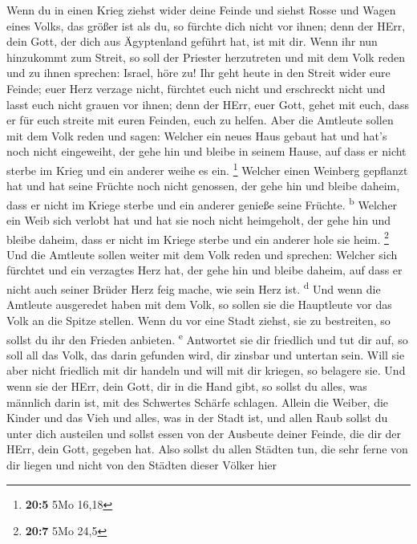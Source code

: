 Wenn du in einen Krieg ziehst wider deine Feinde und
siehst Rosse und Wagen eines Volks, das größer ist als du, so fürchte
dich nicht vor ihnen; denn der HErr, dein Gott, der dich aus Ägyptenland
geführt hat, ist mit dir.  Wenn ihr nun hinzukommt zum
Streit, so soll der Priester herzutreten und mit dem Volk reden
 und zu ihnen sprechen: Israel, höre zu! Ihr geht heute in
den Streit wider eure Feinde; euer Herz verzage nicht, fürchtet euch
nicht und erschreckt nicht und lasst euch nicht grauen vor ihnen;
 denn der HErr, euer Gott, gehet mit euch, dass er für
euch streite mit euren Feinden, euch zu helfen.  Aber die
Amtleute sollen mit dem Volk reden und sagen: Welcher ein neues Haus
gebaut hat und hat's noch nicht eingeweiht, der gehe hin und bleibe in
seinem Hause, auf dass er nicht sterbe im Krieg und ein anderer weihe es
ein. \footnote{\textbf{20:5} 5Mo 16,18}  Welcher einen
Weinberg gepflanzt hat und hat seine Früchte noch nicht genossen, der
gehe hin und bleibe daheim, dass er nicht im Kriege sterbe und ein
anderer genieße seine Früchte. \textsuperscript{b} 
Welcher ein Weib sich verlobt hat und hat sie noch nicht heimgeholt, der
gehe hin und bleibe daheim, dass er nicht im Kriege sterbe und ein
anderer hole sie heim. \footnote{\textbf{20:7} 5Mo 24,5} 
Und die Amtleute sollen weiter mit dem Volk reden und sprechen: Welcher
sich fürchtet und ein verzagtes Herz hat, der gehe hin und bleibe
daheim, auf dass er nicht auch seiner Brüder Herz feig mache, wie sein
Herz ist. \textsuperscript{d}  Und wenn die Amtleute
ausgeredet haben mit dem Volk, so sollen sie die Hauptleute vor das Volk
an die Spitze stellen.  Wenn du vor eine Stadt ziehst,
sie zu bestreiten, so sollst du ihr den Frieden anbieten.
\textsuperscript{e}  Antwortet sie dir friedlich und tut
dir auf, so soll all das Volk, das darin gefunden wird, dir zinsbar und
untertan sein.  Will sie aber nicht friedlich mit dir
handeln und will mit dir kriegen, so belagere sie.  Und
wenn sie der HErr, dein Gott, dir in die Hand gibt, so sollst du alles,
was männlich darin ist, mit des Schwertes Schärfe schlagen.
 Allein die Weiber, die Kinder und das Vieh und alles,
was in der Stadt ist, und allen Raub sollst du unter dich austeilen und
sollst essen von der Ausbeute deiner Feinde, die dir der HErr, dein
Gott, gegeben hat.  Also sollst du allen Städten tun, die
sehr ferne von dir liegen und nicht von den Städten dieser Völker hier
